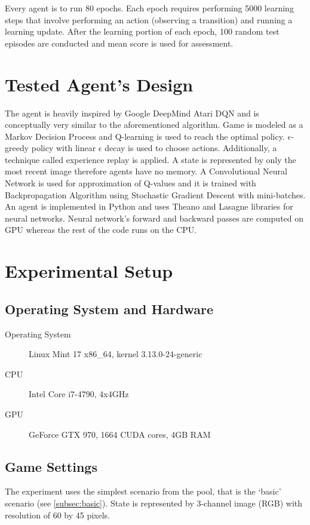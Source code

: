 \documentclass[english,bachelor,a4paper,twoside]{ppfcmthesis}
\begin{document}
Every agent is to run 80 epochs. Each epoch requires performing 5000 learning steps that involve performing an action (observing a transition) and running a learning update. After the learning portion of each epoch, 100 random test episodes are conducted and mean score is used for assessment.  

\section{Tested Agent's Design}
	The agent is heavily inspired by Google DeepMind Atari DQN \cite{mnih-dqn-2015}\cite{mnih-atari-2013} and is conceptually very similar to the aforementioned algorithm. Game is modeled as a Markov Decision Process and Q-learning \cite{watkins:mlj92} is used to reach the optimal policy. $\epsilon$-greedy policy with linear $\epsilon$ decay is used to choose actions. Additionally, a technique called experience replay \cite{mnih-dqn-2015} is applied. A state is represented by only the most recent image therefore agents have no memory. A Convolutional Neural Network is used for approximation of Q-values and it is trained with Backpropagation Algorithm \cite{lecun-98b} using Stochastic Gradient Descent with mini-batches. An agent is implemented in Python and uses Theano \cite{Bastien-Theano-2012}\cite{bergstra+al:2010-scipy} and Lasagne \cite{sander_dieleman_2015_27878} libraries for neural networks. Neural network's forward and backward passes are computed on GPU whereas the rest of the code runs on the CPU.

\newpage
\section{Experimental Setup} 
	\subsection{Operating System and Hardware}
	\begin{description}
		\item[Operating System] Linux Mint 17 x86\_64, kernel 3.13.0-24-generic
		\item[CPU] Intel Core i7-4790, 4x4GHz
		\item[GPU] GeForce GTX 970, 1664 CUDA cores, 4GB RAM
	\end{description}

	\subsection{Game Settings}
		The experiment uses the simplest scenario from the pool, that is the `basic' scenario (see \ref{subsec:basic}). State is represented by 3-channel image (RGB) with resolution of 60 by 45 pixels.
\end{document}

